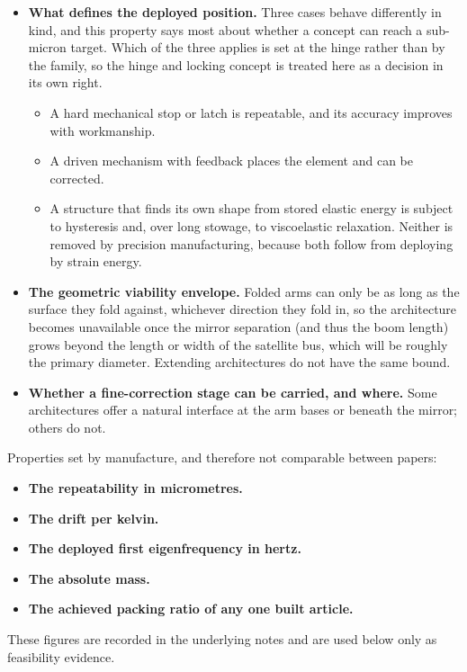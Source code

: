 \begin{itemize}
    \item \textbf{What defines the deployed position.} Three cases behave differently in kind, and this property says most about whether a concept can reach a sub-micron target. Which of the three applies is set at the hinge rather than by the family, so the hinge and locking concept is treated here as a decision in its own right.
    \begin{itemize}
        \item A hard mechanical stop or latch is repeatable, and its accuracy improves with workmanship.
        \item A driven mechanism with feedback places the element and can be corrected.
        \item A structure that finds its own shape from stored elastic energy is subject to hysteresis and, over long stowage, to viscoelastic relaxation. Neither is removed by precision manufacturing, because both follow from deploying by strain energy.
    \end{itemize}
    \item \textbf{The geometric viability envelope.} Folded arms can only be as long as the surface they fold against, whichever direction they fold in, so the architecture becomes unavailable once the mirror separation (and thus the boom length) grows beyond the length or width of the satellite bus, which will be roughly the primary diameter. Extending architectures do not have the same bound.
    \item \textbf{Whether a fine-correction stage can be carried, and where.} Some architectures offer a natural interface at the arm bases or beneath the mirror; others do not.
\end{itemize}

Properties set by manufacture, and therefore not comparable between papers:

\begin{itemize}
    \item \textbf{The repeatability in micrometres.}
    \item \textbf{The drift per kelvin.}
    \item \textbf{The deployed first eigenfrequency in hertz.}
    \item \textbf{The absolute mass.}
    \item \textbf{The achieved packing ratio of any one built article.}
\end{itemize}

These figures are recorded in the underlying notes and are used below only as feasibility evidence.

